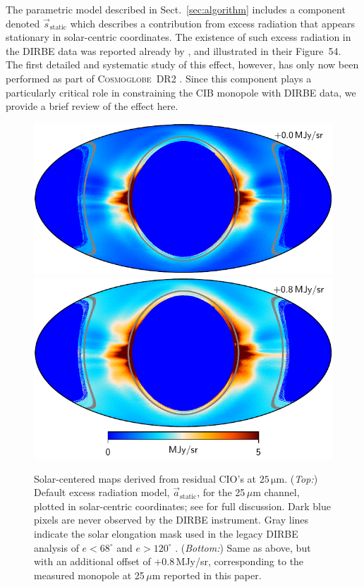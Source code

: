 \documentclass{aa}
\newcommand{\s}[0]{\vec{s}}
\renewcommand{\a}[0]{\vec{a}}
\newcommand{\cosmoglobe}{\textsc{Cosmoglobe}}
\begin{document}
The parametric model described in Sect.~\ref{sec:algorithm} includes a
component denoted $\s_{\mathrm{static}}$ which describes a
contribution from excess radiation that appears stationary in
solar-centric coordinates. The existence of such excess radiation in
the DIRBE data was reported already by \citet{leinert:1998}, and
illustrated in their Figure~54. The first detailed and systematic
study of this effect, however, has only now been performed as part of
\cosmoglobe\ DR2 \citep{CG02_01}. Since this component plays a
particularly critical role in constraining the CIB monopole with DIRBE
data, we provide a brief review of the effect here.

\begin{figure}
  \centering
  \includegraphics[width=\linewidth]{figs/solarmap_06_v1_mono0.pdf}\\
  \includegraphics[width=\linewidth]{figs/solarmap_06_v1_mono8.pdf}
	\caption{Solar-centered maps derived from residual CIO's at $25\,\mathrm{\mu m}$. (\emph{Top:}) Default excess radiation model, $\a_{\mathrm{static}}$, for the 25\,$\mu$m channel, plotted in solar-centric coordinates; see \citet{CG02_01} for full discussion. Dark blue pixels are never observed by the DIRBE instrument. Gray lines indicate the solar elongation mask used in the legacy DIRBE analysis of $e < 68^{\circ}$ and $e >120^{\circ}$ \citep{kelsall1998}. (\emph{Bottom:}) Same as above, but with an additional offset of +0.8\,MJy/sr, corresponding to the measured monopole at 25\,$\mu$m reported in this paper.}
  \label{fig:sidelobe}
\end{figure}
\end{document}
